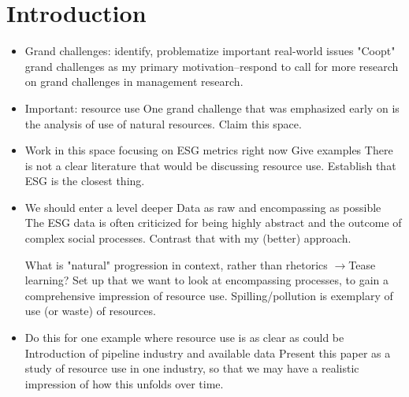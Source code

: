 	\section{Introduction}
	
	\begin{paracol}{2}
	\begin{itemize}
		\item Grand challenges: identify, problematize important real-world issues \citep{George2016}
		\switchcolumn "Coopt" grand challenges as my primary motivation--respond to 
		call for more research on grand challenges in management research. 	
		\switchcolumn*
		
		\item Important: resource use \citep{George2015}
		\switchcolumn One grand challenge that was emphasized early on is the analysis of use of natural resources. Claim this space.
		\switchcolumn*
				
		\item Work in this space focusing on ESG metrics right now
			\subitem Give examples	
		\switchcolumn There is not a clear literature that would be discussing resource use. Establish that ESG is the closest thing.
		\switchcolumn*
		
		\item We should enter a level deeper
			\subitem Data as raw and encompassing as possible
		\switchcolumn The ESG data is often criticized for being highly abstract and the outcome of complex social processes. Contrast that with my (better) approach.
		\switchcolumn*
		
			\subitem What is "natural" progression in context, rather than rhetorics
				\subsubitem $\rightarrow$Tease learning?
		\switchcolumn Set up that we want to look at encompassing processes, to gain a comprehensive impression of resource use. Spilling/pollution is exemplary of use (or waste) of resources.
		\switchcolumn*
		
		\item Do this for one example where resource use is as clear as could be
			\subitem Introduction of pipeline industry and available data
		\switchcolumn Present this paper as a study of resource use in one industry, so that we may have a realistic impression of how this unfolds over time.		
	\end{itemize}
	\end{paracol}

